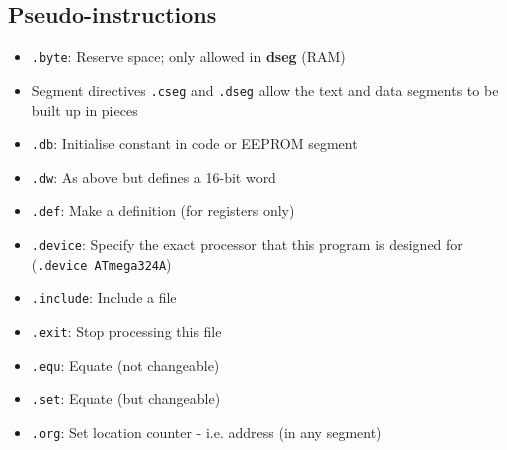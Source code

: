 \subsection{Pseudo-instructions}
\begin{itemize}
	\item \texttt{.byte}: Reserve space; only allowed in \textbf{dseg} (RAM)
	\item Segment directives \texttt{.cseg} and \texttt{.dseg} allow the text and data segments to be built up in pieces
	\item \texttt{.db}: Initialise constant in code or EEPROM segment
	\item \texttt{.dw}: As above but defines a 16-bit word
	\item \texttt{.def}: Make a definition (for registers only)
	\item \texttt{.device}: Specify the exact processor that this program is designed for (\texttt{.device ATmega324A})
	\item \texttt{.include}: Include a file
	\item \texttt{.exit}: Stop processing this file
	\item \texttt{.equ}: Equate (not changeable)
	\item \texttt{.set}: Equate (but changeable)
	\item \texttt{.org}: Set location counter - i.e. address (in any segment)
\end{itemize}
